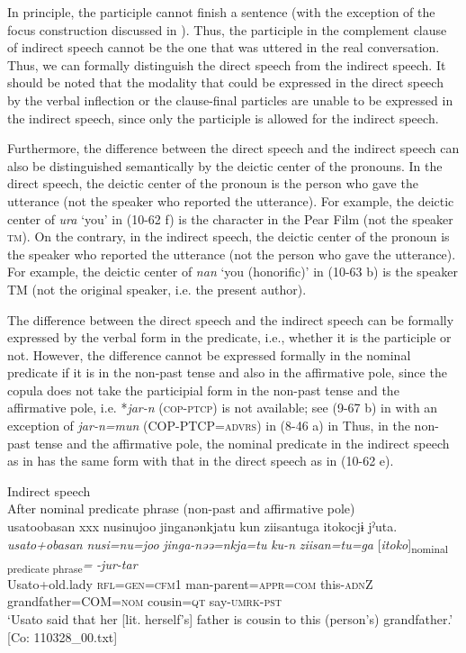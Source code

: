 In principle, the participle cannot finish a sentence (with the exception of the focus construction discussed in ). Thus, the participle in the complement clause of indirect speech cannot be the one that was uttered in the real conversation. Thus, we can formally distinguish the direct speech from the indirect speech. It should be noted that the modality that could be expressed in the direct speech by the verbal inflection or the clause-final particles are unable to be expressed in the indirect speech, since only the participle is allowed for the indirect speech.

  Furthermore, the difference between the direct speech and the indirect speech can also be distinguished semantically by the deictic center of the pronouns. In the direct speech, the deictic center of the pronoun is the person who gave the utterance (not the speaker who reported the utterance). For example, the deictic center of \textit{ura} ‘you’ in (10-62 f) is the character in the Pear Film (not the speaker \textsc{tm}). On the contrary, in the indirect speech, the deictic center of the pronoun is the speaker who reported the utterance (not the person who gave the utterance). For example, the deictic center of \textit{nan} ‘you (honorific)’ in (10-63 b) is the speaker TM (not the original speaker, i.e. the present author).

The difference between the direct speech and the indirect speech can be formally expressed by the verbal form in the predicate, i.e., whether it is the participle or not. However, the difference cannot be expressed formally in the nominal predicate if it is in the non-past tense and also in the affirmative pole, since the copula does not take the participial form in the non-past tense and the affirmative pole, i.e. *\textit{jar-n} (\textsc{cop}-\textsc{ptcp}) is not available; see (9-67 b) in  with an exception of \textit{jar-n=mun} (COP-PTCP=\textsc{advrs}) in (8-46 a) in  Thus, in the non-past tense and the affirmative pole, the nominal predicate in the indirect speech as in  has the same form with that in the direct speech as in (10-62 e).

\ea\label{ex:10.64}   Indirect speech\\
  After nominal predicate phrase (non-past and affirmative pole)\\
      \glll    usato{\textbar}obasan{\textbar}  xxx  nusinujoo  jinganənkjatu  kun  ziisantuga  {\textbar}itoko{\textbar}cjɨ   jˀuta.\\
    \textit{usato+obasan}    \textit{nusi=nu=joo}  \textit{jinga-nəə=nkja=tu}  \textit{ku-n}  \textit{ziisan=tu=ga}  [\textit{itoko}]\textsubscript{nominal predicate phrase}\textit{=} \textit{-jur-tar}\\
    Usato+old.lady    \textsc{rfl}=\textsc{gen}=\textsc{cfm}1  man-parent=\textsc{appr}=\textsc{com} this-\textsc{adn}Z  grandfather=COM=\textsc{nom}  cousin=\textsc{qt}   say-\textsc{umrk}-\textsc{pst}\\
    \glt ‘Usato said that her [lit. herself’s] father is cousin to this (person’s) grandfather.’ [Co: 110328\_00.txt]
\z

